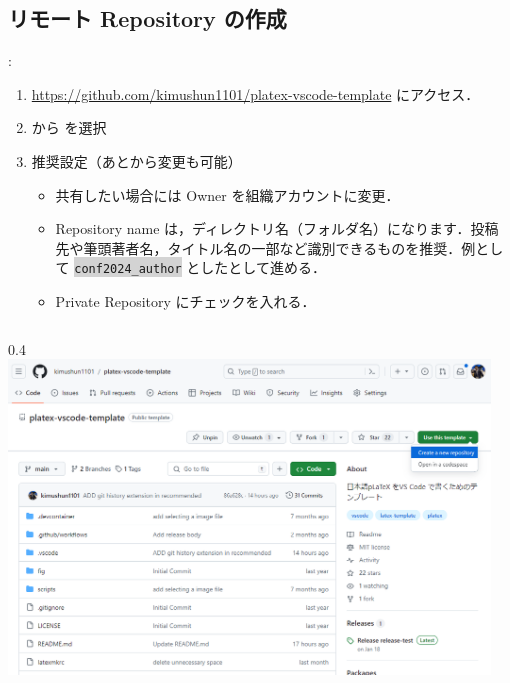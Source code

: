 \documentclass[aspectratio=169,dvipdfmx,cjk]{beamer}
\newcommand{\cmdline}[1]{
    \colorbox{lightgray}{\lstinline[style=command]{#1}}
}
\begin{document}
\subsection{リモート Repository の作成}
\begin{frame}{\insertsection \thesubsection: \insertsubsection}
  \begin{enumerate}
    \item \href{https://github.com/kimushun1101/platex-vscode-template}{https://github.com/kimushun1101/platex-vscode-template} にアクセス．
    \item {} から  を選択
    \item 推奨設定（あとから変更も可能）
    \begin{itemize}
      \item 共有したい場合には Owner を組織アカウントに変更．
      \item Repository name は，ディレクトリ名（フォルダ名）になります．投稿先や筆頭著者名，タイトル名の一部など識別できるものを推奨．例として \cmdline{conf2024_author} としたとして進める．
      \item Private Repository にチェックを入れる．
    \end{itemize}
  \end{enumerate}
  \begin{columns}
    \begin{column}{0.4\textwidth}
        \includegraphics[width=1.0\linewidth]{fig/platex-vecode-temp.png}
    \end{column}
    \begin{column}{0.28\textwidth}

\end{column}
\end{columns}
\end{frame}
\end{document}
